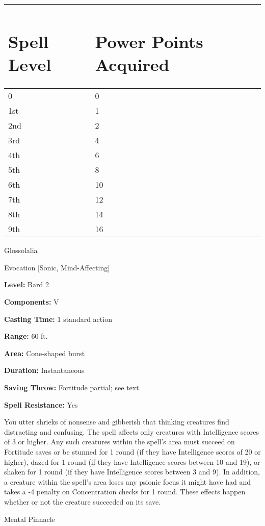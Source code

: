 \documentclass{article}
\begin{document}
\vspace{12pt}
\begin{tabular}{|>{\raggedright}p{50pt}|>{\raggedright}p{59pt}|}
\hline
\section*{S\textbf{pell Level}} & \section*{P\textbf{ower Points Acquired}}\tabularnewline
\hline
0 & 0\tabularnewline
\hline
1st & 1\tabularnewline
\hline
2nd & 2\tabularnewline
\hline
3rd & 4\tabularnewline
\hline
4th & 6\tabularnewline
\hline
5th & 8\tabularnewline
\hline
6th & 10\tabularnewline
\hline
7th & 12\tabularnewline
\hline
8th & 14\tabularnewline
\hline
9th & 16\tabularnewline
\hline
\end{tabular}

\vspace{12pt}
Glossolalia

Evocation [Sonic, Mind-Affecting]

\textbf{Level:} Bard 2

\textbf{Components:} V

\textbf{Casting Time:} 1 standard action

\textbf{Range:} 60 ft.

\textbf{Area:} Cone-shaped burst

\textbf{Duration: }Instantaneous

\textbf{Saving Throw:} Fortitude partial; see text

\textbf{Spell Resistance:} Yes

You utter shrieks of nonsense and gibberish that thinking creatures find distracting 
and confusing. The spell affects only creatures with Intelligence scores of 3 or 
higher. Any such creatures within the spell's area must succeed on Fortitude saves 
or be stunned for 1 round (if they have Intelligence scores of 20 or higher), dazed 
for 1 round (if they have Intelligence scores between 10 and 19), or shaken for 
1 round (if they have Intelligence scores between 3 and 9). In addition, a creature 
within the spell's area loses any psionic focus it might have had and takes a -4 
penalty on Concentration checks for 1 round. These effects happen whether or not 
the creature succeeded on its save.

\vspace{12pt}
Mental Pinnacle
\end{document}
